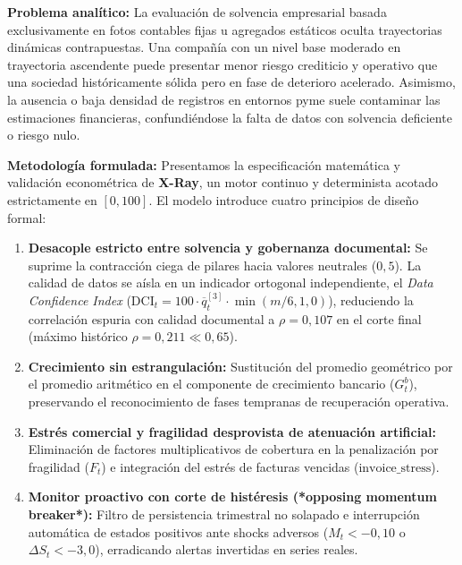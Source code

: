\documentclass[10pt,a4paper]{article}
\begin{document}
\begin{tcolorbox}[paperbox, title=Resumen Ejecutivo y Declaración de Alcance Metodológico]
\small
\textbf{Problema analítico:} La evaluación de solvencia empresarial basada exclusivamente en fotos contables fijas u agregados estáticos oculta trayectorias dinámicas contrapuestas. Una compañía con un nivel base moderado en trayectoria ascendente puede presentar menor riesgo crediticio y operativo que una sociedad históricamente sólida pero en fase de deterioro acelerado. Asimismo, la ausencia o baja densidad de registros en entornos pyme suele contaminar las estimaciones financieras, confundiéndose la falta de datos con solvencia deficiente o riesgo nulo.

\textbf{Metodología formulada:} Presentamos la especificación matemática y validación econométrica de \textbf{X-Ray}, un motor continuo y determinista acotado estrictamente en $[0, 100]$. El modelo introduce cuatro principios de diseño formal:
\begin{enumerate}[leftmargin=*, noitemsep, topsep=1pt]
  \item \textbf{Desacople estricto entre solvencia y gobernanza documental:} Se suprime la contracción ciega de pilares hacia valores neutrales ($0{,}5$). La calidad de datos se aísla en un indicador ortogonal independiente, el \emph{Data Confidence Index} ($\text{DCI}_t = 100 \cdot \overline{q}_t^{[3]} \cdot \min(m/6, 1{,}0)$), reduciendo la correlación espuria con calidad documental a $\rho = 0{,}107$ en el corte final (máximo histórico $\rho = 0{,}211 \ll 0{,}65$).
  \item \textbf{Crecimiento sin estrangulación:} Sustitución del promedio geométrico por el promedio aritmético en el componente de crecimiento bancario ($G_t^b$), preservando el reconocimiento de fases tempranas de recuperación operativa.
  \item \textbf{Estrés comercial y fragilidad desprovista de atenuación artificial:} Eliminación de factores multiplicativos de cobertura en la penalización por fragilidad ($F_t$) e integración del estrés de facturas vencidas ($\text{invoice\_stress}$).
  \item \textbf{Monitor proactivo con corte de histéresis (*opposing momentum breaker*):} Filtro de persistencia trimestral no solapado e interrupción automática de estados positivos ante shocks adversos ($M_t < -0{,}10$ o $\Delta S_t < -3{,}0$), erradicando alertas invertidas en series reales.
\end{enumerate}


\end{tcolorbox}
\end{document}
